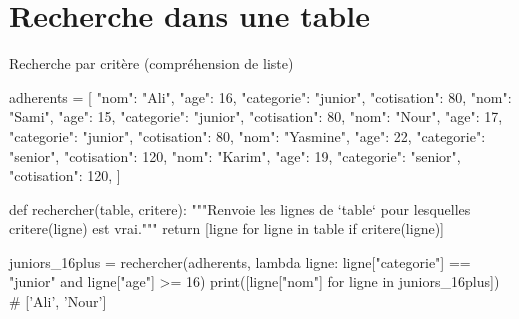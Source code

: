 \section{Recherche dans une table}


\begin{codereference}{Recherche par critère (compréhension de liste)}
\begin{python}
adherents = [
    {"nom": "Ali", "age": 16, "categorie": "junior", "cotisation": 80},
    {"nom": "Sami", "age": 15, "categorie": "junior", "cotisation": 80},
    {"nom": "Nour", "age": 17, "categorie": "junior", "cotisation": 80},
    {"nom": "Yasmine", "age": 22, "categorie": "senior", "cotisation": 120},
    {"nom": "Karim", "age": 19, "categorie": "senior", "cotisation": 120},
]

def rechercher(table, critere):
    """Renvoie les lignes de `table` pour lesquelles critere(ligne) est vrai."""
    return [ligne for ligne in table if critere(ligne)]

juniors_16plus = rechercher(adherents, lambda ligne: ligne["categorie"] == "junior" and ligne["age"] >= 16)
print([ligne["nom"] for ligne in juniors_16plus])  # ['Ali', 'Nour']
\end{python}
\end{codereference}


